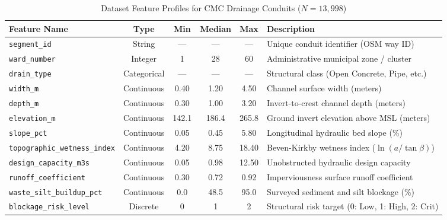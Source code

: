 \begin{table}[h!]
\centering
\caption{Dataset Feature Profiles for CMC Drainage Conduits ($N = 13{,}998$)}
\label{tab:dataset_features}
\fontsize{9pt}{11pt}\selectfont
\begin{tabular}{|l|c|c|c|c|p{4.0cm}|}
\hline
\textbf{Feature Name} & \textbf{Type} & \textbf{Min} & \textbf{Median} & \textbf{Max} & \textbf{Description} \\
\hline
\texttt{segment\_id} & String & --- & --- & --- & Unique conduit identifier (OSM way ID) \\
\texttt{ward\_number} & Integer & 1 & 28 & 60 & Administrative municipal zone / cluster \\
\texttt{drain\_type} & Categorical & --- & --- & --- & Structural class (Open Concrete, Pipe, etc.) \\
\texttt{width\_m} & Continuous & 0.40 & 1.20 & 4.50 & Channel surface width (meters) \\
\texttt{depth\_m} & Continuous & 0.30 & 1.00 & 3.20 & Invert-to-crest channel depth (meters) \\
\texttt{elevation\_m} & Continuous & 142.1 & 186.4 & 265.8 & Ground invert elevation above MSL (meters) \\
\texttt{slope\_pct} & Continuous & 0.05 & 0.45 & 5.80 & Longitudinal hydraulic bed slope (\%) \\
\texttt{topographic\_wetness\_index} & Continuous & 4.20 & 8.75 & 18.40 & Beven-Kirkby wetness index ($\ln(a / \tan \beta)$) \\
\texttt{design\_capacity\_m3s} & Continuous & 0.05 & 0.98 & 12.50 & Unobstructed hydraulic design capacity \\
\texttt{runoff\_coefficient} & Continuous & 0.30 & 0.72 & 0.92 & Imperviousness surface runoff coefficient \\
\texttt{waste\_silt\_buildup\_pct} & Continuous & 0.0 & 48.5 & 95.0 & Surveyed sediment and silt blockage (\%) \\
\texttt{blockage\_risk\_level} & Discrete & 0 & 1 & 2 & Structural risk target (0: Low, 1: High, 2: Crit) \\
\hline
\end{tabular}
\end{table}

